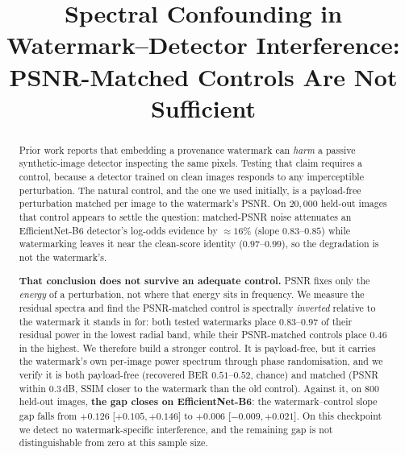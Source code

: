 \documentclass[journal]{IEEEtran}
\begin{document}
\title{Spectral Confounding in Watermark--Detector Interference:
PSNR-Matched Controls Are Not Sufficient}

\author{
}

\maketitle

\begin{abstract}
Prior work reports that embedding a provenance watermark can \emph{harm} a
passive synthetic-image detector inspecting the same pixels. Testing that
claim requires a control, because a detector trained on clean images responds
to any imperceptible perturbation. The natural control, and the one we used
initially, is a payload-free perturbation matched per image to the
watermark's PSNR. On $20{,}000$ held-out images that control appears to
settle the question: matched-PSNR noise attenuates an EfficientNet-B6
detector's log-odds evidence by $\approx 16\%$ (slope $0.83$--$0.85$) while
watermarking leaves it near the clean-score identity ($0.97$--$0.99$), so the
degradation is not the watermark's.

\textbf{That conclusion does not survive an adequate control.} PSNR fixes
only the \emph{energy} of a perturbation, not where that energy sits in
frequency. We measure the residual spectra and find the PSNR-matched control
is spectrally \emph{inverted} relative to the watermark it stands in for:
both tested watermarks place $0.83$--$0.97$ of their residual power in the
lowest radial band, while their PSNR-matched controls place $0.46$ in the
highest. We therefore build a stronger control. It is payload-free, but it
carries the watermark's own per-image power spectrum through phase
randomisation, and we verify it is both payload-free (recovered BER
$0.51$--$0.52$, chance) and matched (PSNR within $0.3$\,dB, SSIM closer to the
watermark than the old control). Against it, on $800$ held-out images,
\textbf{the gap closes on EfficientNet-B6}: the watermark--control slope gap
falls from $+0.126$ [$+0.105,+0.146$] to $+0.006$ [$-0.009,+0.021$]. On this
checkpoint we detect no watermark-specific interference, and the remaining
gap is not distinguishable from zero at this sample size.


\end{abstract}
\end{document}
